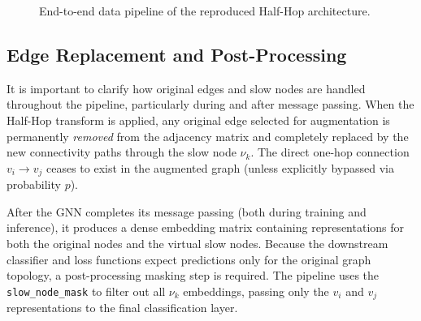 \documentclass[conference]{IEEEtran}
\begin{document}
\begin{figure}[H]
\centering
{}
\caption{End-to-end data pipeline of the reproduced Half-Hop architecture.}
\label{fig:pipeline}
\end{figure}

\subsection{Edge Replacement and Post-Processing}
It is important to clarify how original edges and slow nodes are handled throughout the pipeline, particularly during and after message passing. When the Half-Hop transform is applied, any original edge selected for augmentation is permanently \textit{removed} from the adjacency matrix and completely replaced by the new connectivity paths through the slow node $\nu_k$. The direct one-hop connection $v_i \rightarrow v_j$ ceases to exist in the augmented graph (unless explicitly bypassed via probability $p$). 

After the GNN completes its message passing (both during training and inference), it produces a dense embedding matrix containing representations for both the original nodes and the virtual slow nodes. Because the downstream classifier and loss functions expect predictions only for the original graph topology, a post-processing masking step is required. The pipeline uses the \texttt{slow\_node\_mask} to filter out all $\nu_k$ embeddings, passing only the $v_i$ and $v_j$ representations to the final classification layer.
\end{document}
